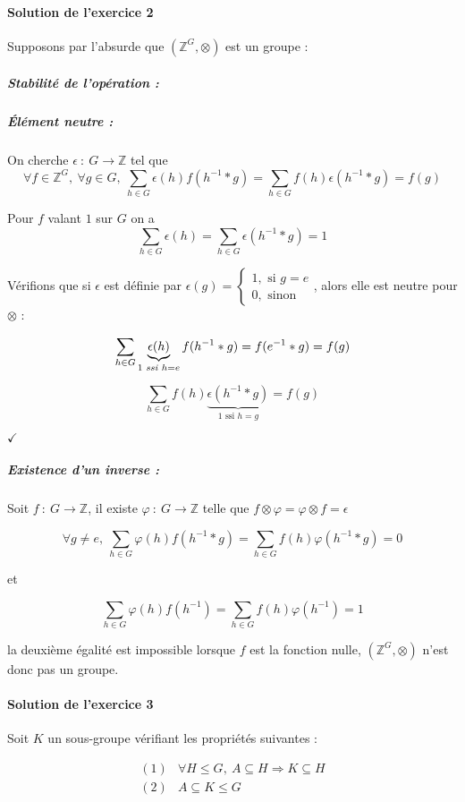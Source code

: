 \documentclass[]{article}
\theoremstyle{remark}
\theoremstyle{definition}
\newcommand{\checked}{
	\hfill$\checkmark$
}
\newcommand{\funcshort}[3]{
#1 ~ : ~ #2 \longrightarrow #3
}
\begin{document}
\paragraph{Solution de l'exercice 2}

Supposons par l'absurde que $\left(\mathbb{Z}^G, \otimes\right)$ est un groupe :

\subparagraph{Stabilité de l'opération :} \checkmark

\subparagraph{Élément neutre :} On cherche $\funcshort{\epsilon}{G}{\mathbb{Z}}$ tel que
$$\forall f \in \mathbb{Z}^G, ~ \forall g \in G, ~ \sum_{h \in G}\epsilon(h)f(h^{-1}*g)=\sum_{h \in G}f(h)\epsilon(h^{-1}*g)=f(g)$$

Pour $f$ valant $1$ sur $G$ on a
$$\sum_{h \in G}\epsilon(h)=\sum_{h \in G}\epsilon(h^{-1}*g)=1$$

Vérifions que si $\epsilon$ est définie par $\epsilon(g) = \left\{
\begin{array}{l}
	1, \text{ si } g = e \\
	0, \text{ sinon}
\end{array}
\right.$, alors elle est neutre pour $\otimes$ :

$$\sum_{h \in G}\underbrace{\epsilon(h)}_{1 \text{ \textit{ssi} } h = e}f(h^{-1}*g) = f(e^{-1}*g) = f(g)$$

$$\sum_{h \in G}f(h)\underbrace{\epsilon(h^{-1}*g)}_{1 \text{ ssi } h = g}=f(g)$$

\checked

\subparagraph{Existence d'un inverse :}
Soit $\funcshort{f}{G}{\mathbb{Z}}$, il existe $\funcshort{\varphi}{G}{\mathbb{Z}}$ telle que $f \otimes \varphi = \varphi \otimes f = \epsilon$

$$\forall g \neq e, ~ \sum_{h \in G}\varphi(h)f(h^{-1}*g)=\sum_{h \in G}f(h)\varphi(h^{-1}*g)=0$$

et

$$\sum_{h \in G}\varphi(h)f(h^{-1})=\sum_{h \in G}f(h)\varphi(h^{-1})=1$$

la deuxième égalité est impossible lorsque $f$ est la fonction nulle, $\left(\mathbb{Z}^G, \otimes\right)$ n'est donc pas un groupe.

\paragraph{Solution de l'exercice 3}
Soit $K$ un sous-groupe vérifiant les propriétés suivantes :

$$
	\begin{array}{lc}
		(1) & \forall H \leqslant G, ~ A \subseteq H \Longrightarrow K \subseteq H \\
		(2) & A \subseteq K \leqslant G
	\end{array}
$$
\end{document}
